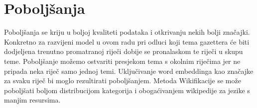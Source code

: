 \documentclass[times, utf8, seminar]{fer}
\begin{document}
\begin{center}
\end{center}

\section{Poboljšanja}
Poboljšanja se kriju u boljoj kvaliteti podataka i otkrivanju nekih bolji značajki. Konkretno za razvijeni model u ovom radu pri odluci koji tema gazettera će biti dodjeljena trenutno promatranoj riječi dobije se pronalaskom te riječi u skupu teme. Poboljšanje možemo ostvariti presjekom tema s okolnim riječima jer ne pripada neka riječ samo jednoj temi. Uključivanje word embeddinga kao značajke za svaku riječ bi moglo rezultirati poboljšanjem. Metoda Wikifikacije se može poboljšati boljom distribucijom kategorija i obogaćivanjem wikipedije za jezike s manjim resursima.
\end{document}
